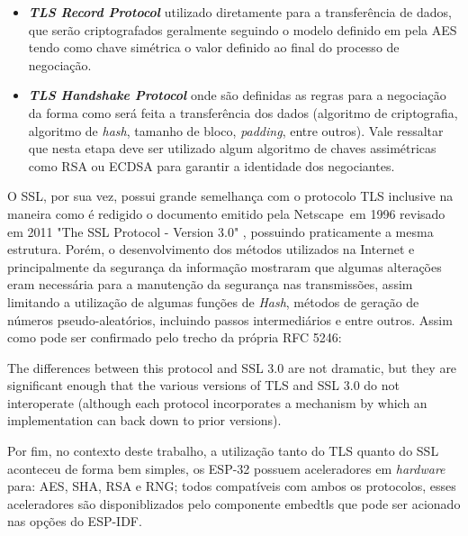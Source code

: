 \begin{itemize}
    \item \textbf{\textit{TLS Record Protocol}} utilizado diretamente para a transferência de dados, que serão 
     criptografados geralmente seguindo o modelo definido em pela \ac{AES} tendo como chave simétrica o valor definido ao final
     do processo de negociação.
     
    \item \textbf{\textit{TLS Handshake Protocol}} onde são definidas as regras para a negociação da forma como será feita a
    transferência dos dados (algoritmo de criptografia, algoritmo de \textit{hash}, tamanho de bloco, \textit{padding}, entre outros).
    Vale ressaltar que nesta etapa deve ser utilizado algum algoritmo de chaves assimétricas como \ac{RSA} ou \ac{ECDSA} para garantir a identidade dos negociantes. 
\end{itemize}

O \ac{SSL}, por sua vez, possui grande semelhança com o protocolo \ac{TLS} inclusive na maneira como
é redigido o documento emitido pela Netscape\textregistered~em 1996 revisado em 2011 "The SSL Protocol - Version 3.0" \cite{netscape}, possuindo praticamente a
mesma estrutura. Porém, o desenvolvimento dos métodos utilizados na Internet e principalmente da segurança da informação
mostraram que algumas alterações eram necessária para a manutenção da segurança nas transmissões, assim limitando a utilização
de algumas funções de \textit{Hash}, métodos de geração de números pseudo-aleatórios, incluindo passos intermediários e entre outros.
Assim como pode ser confirmado pelo trecho da própria RFC 5246:

\begin{citacao}
   The differences between this protocol and SSL 3.0 are not dramatic, but they are
   significant enough that the various versions of TLS and SSL 3.0 do
   not interoperate (although each protocol incorporates a mechanism by
   which an implementation can back down to prior versions).\cite{tls-sec}
\end{citacao}

Por fim, no contexto deste trabalho, a utilização tanto do \ac{TLS} quanto do \ac{SSL} aconteceu de forma bem simples, os ESP-32
possuem aceleradores em \textit{hardware} para: \ac{AES}, \ac{SHA}, \ac{RSA} e \ac{RNG}; todos compatíveis com ambos os protocolos,
esses aceleradores são disponiblizados pelo componente embedtls que pode ser acionado nas opções do \ac{ESP-IDF}.

